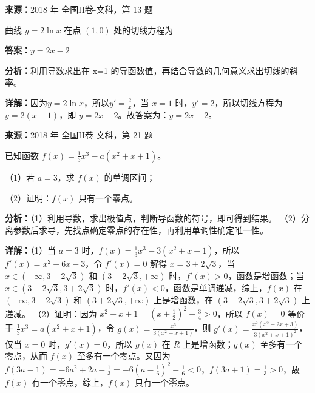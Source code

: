 \begin{question}[points=5]
\textbf{来源：}2018 年 全国II卷-文科，第 13 题\par
曲线 $y=2\ln x$ 在点 $(1,0)$ 处的切线方程为
\fillin[{$y=2x-2$}]
\begin{solution}
\textbf{答案：}$y=2x-2$

\textbf{分析：}利用导数求出在 x=1 的导函数值，再结合导数的几何意义求出切线的斜率。

\textbf{详解：}因为$y=2\ln x$，所以$y'=\frac{2}{x}$，当 $x=1$ 时，$y'=2$，所以切线方程为 $y=2(x-1)$，即 $y=2x-2$。故答案为：$y=2x-2$。
\end{solution}
\end{question}

\begin{question}[points=12]
\textbf{来源：}2018 年 全国II卷-文科，第 21 题\par
已知函数 $f(x)=\frac{1}{3}x^3-a(x^2+x+1)$。

（1）若 $a=3$，求 $f(x)$ 的单调区间；

（2）证明：$f(x)$ 只有一个零点。
\begin{solution}

\textbf{分析：}（1）利用导数，求出极值点，判断导函数的符号，即可得到结果。
（2）分离参数后求导，先找点确定零点的存在性，再利用单调性确定唯一性。

\textbf{详解：}（1）当 $a=3$ 时，$f(x)=\frac{1}{3}x^3-3(x^2+x+1)$，所以 $f'(x)=x^2-6x-3$，令 $f'(x)=0$ 解得 $x=3\pm2\sqrt{3}$，当 $x\in(-\infty,3-2\sqrt{3})$ 和 $(3+2\sqrt{3},+\infty)$ 时，$f'(x)>0$，函数是增函数；当 $x\in(3-2\sqrt{3},3+2\sqrt{3})$ 时，$f'(x)<0$，函数是单调递减，综上，$f(x)$ 在 $(-\infty,3-2\sqrt{3})$ 和 $(3+2\sqrt{3},+\infty)$ 上是增函数，在 $(3-2\sqrt{3},3+2\sqrt{3})$ 上递减。
（2）证明：因为 $x^2+x+1=(x+\frac{1}{2})^2+\frac{3}{4}>0$，所以 $f(x)=0$ 等价于 $\frac{1}{3}x^3=a(x^2+x+1)$，令 $g(x)=\frac{x^3}{3(x^2+x+1)}$，则 $g'(x)=\frac{x^2(x^2+2x+3)}{3(x^2+x+1)^2}$，仅当 $x=0$ 时，$g'(x)=0$，所以 $g(x)$ 在 $R$ 上是增函数；$g(x)$ 至多有一个零点，从而 $f(x)$ 至多有一个零点。又因为 $f(3a-1)=-6a^2+2a-\frac{1}{3}=-6(a-\frac{1}{6})^2-\frac{1}{6}<0$，$f(3a+1)=\frac{1}{3}>0$，故 $f(x)$ 有一个零点，综上，$f(x)$ 只有一个零点。
\end{solution}
\end{question}

